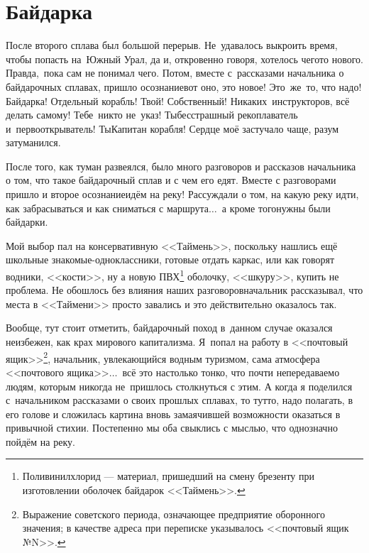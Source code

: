 \chapter{Байдарка}

После второго сплава был большой перерыв. Не~удавалось выкроить время, чтобы попасть на~Южный Урал, да и, откровенно говоря, хотелось чего\sdash то нового. Правда,~пока сам не понимал чего. Потом, вместе с~рассказами начальника о байдарочных сплавах, пришло осознание\mdash вот оно, это новое! Это~же~то, что надо! Байдарка! Отдельный корабль! Твой! Собственный! Никаких~инструкторов, всё делать самому! Тебе~никто не~указ! Ты\mdash бесстрашный рекоплаватель и~первооткрыватель! Ты\mdash Капитан корабля! Сердце моё застучало чаще, разум затуманился. 

\renewcommand*{\thefootnote}{\arabic{footnote}}
После того, как туман развеялся, было много разговоров и рассказов начальника о том, что такое байдарочный сплав и с чем его едят. Вместе с разговорами пришло и второе осознание\mdash идём на реку! Рассуждали о том, на какую реку идти, как забрасываться и как сниматься с маршрута$\ldots$~а кроме того\mdash нужны были байдарки. 

Мой выбор пал на консервативную <<Таймень>>, поскольку нашлись ещё школьные знакомые-одноклассники, готовые отдать каркас, или как говорят водники, <<кости>>, ну а новую ПВХ\footnote{Поливинилхлорид --- материал, пришедший на смену брезенту при изготовлении оболочек байдарок <<Таймень>>.} оболочку, <<шкуру>>, купить не проблема. Не обошлось без влияния наших разговоров\mdash начальник рассказывал, что места в <<Таймени>> просто завались и это действительно оказалось так.

Вообще, тут стоит отметить, байдарочный поход в~данном случае оказался неизбежен, как крах мирового капитализма. Я~попал на работу в <<почтовый ящик>>\footnote{Выражение советского периода, означающее предприятие оборонного значения; в качестве адреса при переписке указывалось <<почтовый ящик №N>>.}, начальник, увлекающийся водным туризмом, сама атмосфера <<почтового ящика>>$\ldots$~всё это настолько тонко, что почти непередаваемо людям, которым никогда не~пришлось столкнуться с этим. А когда я поделился с~начальником рассказами о своих прошлых сплавах, то тут\sdash то, надо полагать, в его голове и сложилась картина вновь замаячившей возможности оказаться в привычной стихии. Постепенно мы оба свыклись с мыслью, что однозначно пойдём на реку.

